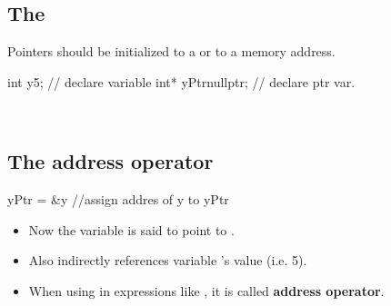 \subsection{The }
\label{subsec:nullptr}
Pointers should be initialized to a  or to a memory address.\\
\begin{minipage}{\MPWxXSxLISTING\textwidth} %
{} %
\begin{CPPCode}
int y{5};   // declare variable
int* yPtr{nullptr};  // declare ptr var.
\end{CPPCode}
\end{minipage}
\\

\subsection{The address operator \CppCommonCode{\&}}
\begin{minipage}{\MPWxXSxLISTING\textwidth} %
{} %
\begin{CPPCode}
yPtr = &y   //assign addres of y to yPtr
\end{CPPCode}
\end{minipage}
\begin{itemize}
    \item Now the variable  is said to point to .
    \item Also  indirectly references variable 's value (i.e. 5).
    \item When using \textquotesingle\CppCommonCode{\&}\textquotesingle{} in expressions like , it is called \textbf{address operator}.
\end{itemize}

